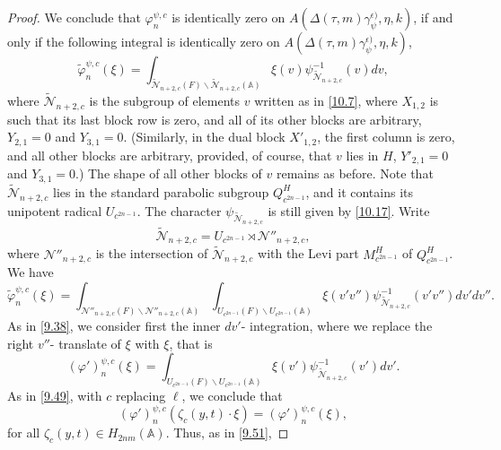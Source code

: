 \documentclass[12pts]{amsart}
\newcommand{\BA}{{\mathbb {A}}}
\begin{document}
\begin{proof}
 We conclude that $\varphi_n^{\psi,c}$ is identically zero on $A(\Delta(\tau,m)\gamma_\psi^{\epsilon)},\eta,k)$, if and only if the following integral is identically zero on $A(\Delta(\tau,m)\gamma_\psi^{\epsilon)},\eta,k)$, 
\begin{equation}\label{10.18}
 \tilde{\varphi}_n^{\psi,c}(\xi)=
 \int_{\tilde{\mathcal{N}}_{n+2,c}(F)\backslash
 	\tilde{\mathcal{N}}_{n+2,c}(\BA)}\xi(v)\psi^{-1}_{\tilde{\mathcal{N}}_{n+2,c}}(v)dv, 
 \end{equation}
 where $\tilde{\mathcal{N}}_{n+2,c}$ is the subgroup of elements $v$ written as in \eqref{10.7}, where $X_{1,2}$ is such that its last block row is zero, and all of its other blocks are arbitrary, $Y_{2,1}=0$ and $Y_{3,1}=0$. (Similarly, in the dual block $X'_{1,2}$, the first column is zero, and all other blocks are arbitrary, provided, of course, that $v$ lies in $H$, $Y'_{2,1}=0$ and $Y_{3,1}=0$.) The shape of all other blocks of $v$ remains as before. Note that $\tilde{\mathcal{N}}_{n+2,c}$ lies in the standard parabolic subgroup $Q^H_{c^{2n-1}}$, and it contains its unipotent radical $U_{c^{2n-1}}$.  The character $\psi_{\tilde{\mathcal{N}}_{n+2,c}}$ is still given by \eqref{10.17}.  
 Write 
 \begin{equation}\label{10.19}
\tilde{\mathcal{N}}_{n+2,c}=U_{c^{2n-1}}\rtimes\mathcal{N}''_{n+2,c},
 \end{equation}
 where $\mathcal{N}''_{n+2,c}$ is the intersection of $\tilde{\mathcal{N}}_{n+2,c}$ with the Levi part $M^H_{c^{2n-1}}$ of $Q^H_{c^{2n-1}}$. We have
 \begin{equation}\label{10.20}
 \tilde{\varphi}_n^{\psi,c}(\xi)=
 \int_{\mathcal{N}''_{n+2,c}(F)\backslash
 	\mathcal{N}''_{n+2,c}(\BA)}\int_{U_{c^{2n-1}}(F)\backslash
 	U_{c^{2n-1}}(\BA)}\xi(v'v'')\psi^{-1}_{\tilde{\mathcal{N}}_{n+2,c}}(v'v'')dv'dv''. 
 \end{equation}
 As in \eqref{9.38}, we consider first the inner $dv'$- integration, where we replace the right $v''$- translate of $\xi$ with $\xi$, that is
 \begin{equation}\label{10.21}
 (\varphi')_n^{\psi,c}(\xi)=
\int_{U_{c^{2n-1}}(F)\backslash
 	U_{c^{2n-1}}(\BA)}\xi(v')\psi^{-1}_{\tilde{\mathcal{N}}_{n+2,c}}(v')dv'. 
 \end{equation}
As in \eqref{9.49}, with $c$ replacing $\ell$, we conclude that
\begin{equation}\label{10.22}
(\varphi')_n^{\psi,c}(\zeta_c(y,t)\cdot\xi)=(\varphi')_n^{\psi,c}(\xi),
\end{equation} 
for all $\zeta_c(y,t)\in H_{2nm}(\BA)$. Thus, as in \eqref{9.51}, 

\end{proof}
\end{document}
